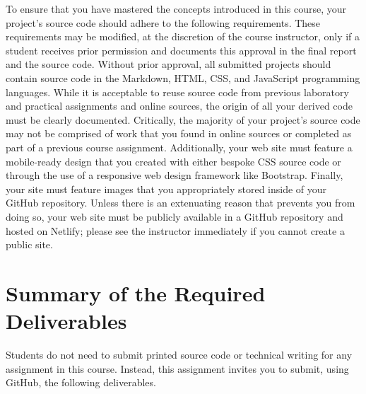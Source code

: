 \documentclass[11pt]{article}
\begin{document}
To ensure that you have mastered the concepts introduced in this course, your
project's source code should adhere to the following requirements. These
requirements may be modified, at the discretion of the course instructor, only
if a student receives prior permission and documents this approval in the final
report and the source code. Without prior approval, all submitted projects
should contain source code in the Markdown, HTML, CSS, and JavaScript
programming languages.
%
While it is acceptable to reuse source code from previous laboratory and
practical assignments and online sources, the origin of all your derived code
must be clearly documented. Critically, the majority of your project's source
code may not be comprised of work that you found in online sources or completed
as part of a previous course assignment.
%
Additionally, your web site must feature a mobile-ready design that you created
with either bespoke CSS source code or through the use of a responsive web
design framework like Bootstrap. Finally, your site must feature images that you
appropriately stored inside of your GitHub repository.
%
Unless there is an extenuating reason that prevents you from doing so, your web
site must be publicly available in a GitHub repository and hosted on Netlify;
please see the instructor immediately if you cannot create a public site.

\section*{Summary of the Required Deliverables}

\noindent Students do not need to submit printed source code or technical
writing for any assignment in this course. Instead, this assignment invites you
to submit, using GitHub, the following deliverables.

\vspace*{-0.05in}
\end{document}
